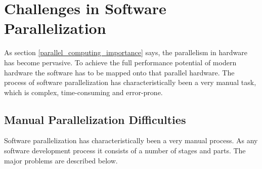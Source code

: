 \section{Challenges in Software Parallelization}
As section \ref{parallel_computing_importance} says, the parallelism in hardware has become pervasive. To achieve the full performance potential of modern hardware the software has to be mapped onto that parallel hardware. The process of software parallelization has characteristically been a very manual task, which is complex, time-consuming and error-prone.     

\subsection{Manual Parallelization Difficulties}
\quad Software parallelization has characteristically been a very manual process. As any software development process it consists of a number of stages and parts. The major problems are described below.
